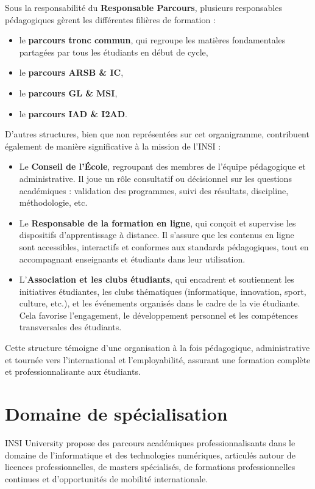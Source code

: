 \documentclass[a4paper,12pt]{book}
\begin{document}
Sous la responsabilité du \textbf{Responsable Parcours}, plusieurs responsables pédagogiques gèrent les différentes filières de formation :
\begin{itemize}
    \item le \textbf{parcours tronc commun}, qui regroupe les matières fondamentales partagées par tous les étudiants en début de cycle,
    \item le \textbf{parcours ARSB \& IC},
    \item le \textbf{parcours GL \& MSI},
    \item le \textbf{parcours IAD \& I2AD}.
\end{itemize}

D’autres structures, bien que non représentées sur cet organigramme, contribuent également de manière significative à la mission de l’INSI :
\begin{itemize}
    \item Le \textbf{Conseil de l’École}, regroupant des membres de l’équipe pédagogique et administrative. Il joue un rôle consultatif ou décisionnel sur les questions académiques : validation des programmes, suivi des résultats, discipline, méthodologie, etc.
    \item Le \textbf{Responsable de la formation en ligne}, qui conçoit et supervise les dispositifs d’apprentissage à distance. Il s’assure que les contenus en ligne sont accessibles, interactifs et conformes aux standards pédagogiques, tout en accompagnant enseignants et étudiants dans leur utilisation.
    \item L’\textbf{Association et les clubs étudiants}, qui encadrent et soutiennent les initiatives étudiantes, les clubs thématiques (informatique, innovation, sport, culture, etc.), et les événements organisés dans le cadre de la vie étudiante. Cela favorise l’engagement, le développement personnel et les compétences transversales des étudiants.
\end{itemize}

Cette structure témoigne d’une organisation à la fois pédagogique, administrative et tournée vers l’international et l’employabilité, assurant une formation complète et professionnalisante aux étudiants.
\section{Domaine de spécialisation}

INSI University propose des parcours académiques professionnalisants dans le domaine de l’informatique et des technologies numériques, articulés autour de licences professionnelles, de masters spécialisés, de formations professionnelles continues et d’opportunités de mobilité internationale.
\end{document}
